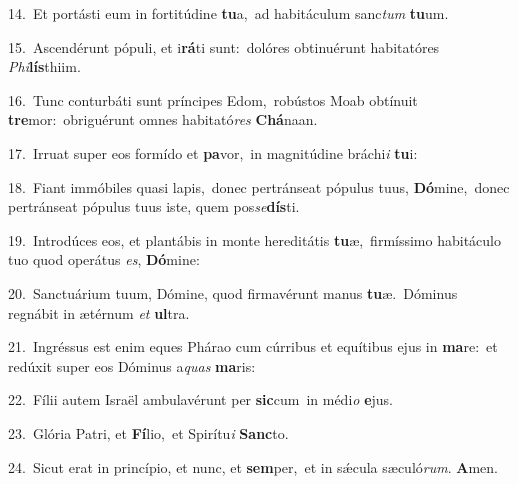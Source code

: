{\numbfont\textcolor{\numbcolor}{14.}}~Et portásti eum in fortitúdine \textbf{tu}\-a,~\star ad habitáculum sanc\textit{tum} \textbf{tu}\-um.\par
{\numbfont\textcolor{\numbcolor}{15.}}~Ascendérunt pópuli, et i\-\textbf{rá}\-ti sunt:~\star dolóres obtinuérunt habitatóres \textit{Phi}\-\textbf{lís}thiim.\par
{\numbfont\textcolor{\numbcolor}{16.}}~Tunc conturbáti sunt príncipes Edom,~\dagger robústos Moab obtínuit \textbf{tre}\-mor:~\star obriguérunt omnes habitató\textit{res} \textbf{Chá}\-naan.\par
{\numbfont\textcolor{\numbcolor}{17.}}~Irruat super eos formído et \textbf{pa}\-vor,~\star in magnitúdine bráchi\textit{i} \textbf{tu}\-i:\par
{\numbfont\textcolor{\numbcolor}{18.}}~Fiant immóbiles quasi lapis,~\dagger donec pertránseat pópulus tuus, \textbf{Dó}\-mine,~\star donec pertránseat pópulus tuus iste, quem pos\-\textit{se}\-\textbf{dís}ti.\par
{\numbfont\textcolor{\numbcolor}{19.}}~Introdúces eos, et plantábis in monte hereditátis \textbf{tu}\-æ,~\star firmíssimo habitáculo tuo quod operátus \textit{es}\-, \textbf{Dó}\-mine:\par
{\numbfont\textcolor{\numbcolor}{20.}}~Sanctuárium tuum, Dómine, quod firmavérunt manus \textbf{tu}\-æ.~\star Dóminus regnábit in ætérnum \textit{et} \textbf{ul}\-tra.\par
{\numbfont\textcolor{\numbcolor}{21.}}~Ingréssus est enim eques Phárao cum cúrribus et equítibus ejus in \textbf{ma}\-re:~\star et redúxit super eos Dóminus a\textit{quas} \textbf{ma}\-ris:\par
{\numbfont\textcolor{\numbcolor}{22.}}~Fílii autem Israël ambulavérunt per \textbf{sic}\-cum~\star in médi\textit{o} \textbf{e}\-jus.\par
{\numbfont\textcolor{\numbcolor}{23.}}~Glória Patri, et \textbf{Fí}\-lio,~\star et Spirítu\textit{i} \textbf{Sanc}\-to.\par
{\numbfont\textcolor{\numbcolor}{24.}}~Sicut erat in princípio, et nunc, et \textbf{sem}\-per,~\star et in sǽcula sæculó\-\textit{rum}\-. \textbf{A}\-men.\par

